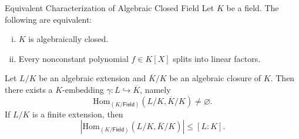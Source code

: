 \begin{proposition}{Equivalent Characterization of Algebraic Closed Field}{}
    Let $K$ be a field. The following are equivalent:
    \begin{enumerate}[(i)]
        \item $K$ is algebraically closed.
        \item Every nonconstant polynomial $f\in K[X]$ splits into linear factors.
    \end{enumerate}
    
\end{proposition}

\begin{proposition}{}{}
    Let $L/K$ be an algebraic extension and $\overline{K}/K$ be an algebraic closure of $K$. Then there exists a $K$-embedding $\gamma:L\hookrightarrow \overline{K}$, namely
    \[
        \mathrm{Hom}_{(K/\mathsf{Field})}(L/K,\overline{K}/K)\ne \varnothing.
    \]
    If $L/K$ is a finite extension, then 
    \[
    |\mathrm{Hom}_{(K/\mathsf{Field})}(L/K,\overline{K}/K)|\le \left[L:K\right].
    \]
\end{proposition}
